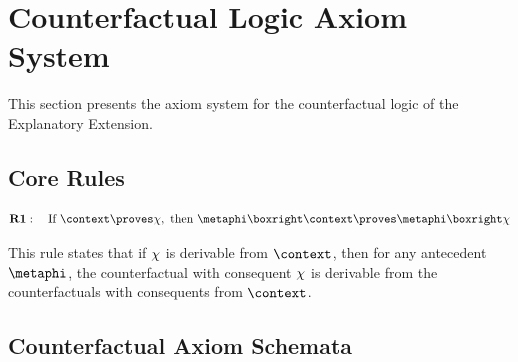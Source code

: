 \documentclass[../LogosReference.tex]{subfiles}
\begin{document}

\section{Counterfactual Logic Axiom System}\label{sec:core-axioms}

This section presents the axiom system for the counterfactual logic of the Explanatory Extension.


\subsection{Core Rules}\label{sec:core-rules}

\begin{definition}\label{def:closure-deduction}
	\[
		\textbf{R1}: \quad \text{If } \context \proves \metaC, \text{ then } \metaphi \boxright \context \proves \metaphi \boxright \metaC
	\]
\end{definition}

\begin{remark}
	This rule states that if $\chi$ is derivable from $\context$, then for any antecedent $\metaphi$, the counterfactual with consequent $\chi$ is derivable from the counterfactuals with consequents from $\context$.
\end{remark}


\subsection{Counterfactual Axiom Schemata}\label{sec:counterfactual-axioms}
\end{document}
